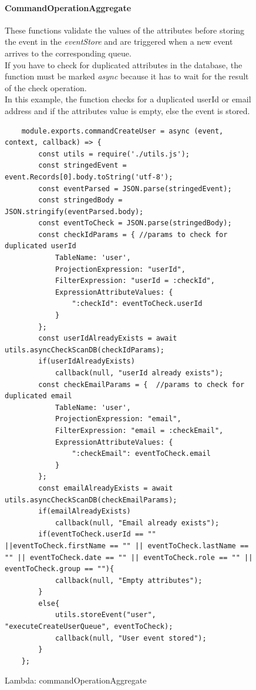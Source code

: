 \begin{figure}
\paragraph{CommandOperationAggregate} \Spazio
These functions validate the values of the attributes before storing the event in the \emph{eventStore} and are triggered when a new event arrives to the corresponding queue. \\ 
If you have to check for duplicated attributes in the database, the function must be marked \emph{async} because it has to wait for the result of the check operation.\\
In this example, the function checks for a duplicated userId or email address and if the attributes value is empty, else the event is stored.
\begin{lstlisting}
	module.exports.commandCreateUser = async (event, context, callback) => {
		const utils = require('./utils.js');
		const stringedEvent = event.Records[0].body.toString('utf-8'); 
		const eventParsed = JSON.parse(stringedEvent);
		const stringedBody = JSON.stringify(eventParsed.body);
		const eventToCheck = JSON.parse(stringedBody);
		const checkIdParams = { //params to check for duplicated userId
			TableName: 'user',
			ProjectionExpression: "userId",
			FilterExpression: "userId = :checkId",
			ExpressionAttributeValues: {
				":checkId": eventToCheck.userId
			}
		};
		const userIdAlreadyExists = await utils.asyncCheckScanDB(checkIdParams); 
		if(userIdAlreadyExists)
			callback(null, "userId already exists");
		const checkEmailParams = {  //params to check for duplicated email
			TableName: 'user',
			ProjectionExpression: "email",
			FilterExpression: "email = :checkEmail",
			ExpressionAttributeValues: {
				":checkEmail": eventToCheck.email
			}
		};
		const emailAlreadyExists = await utils.asyncCheckScanDB(checkEmailParams);
		if(emailAlreadyExists)
			callback(null, "Email already exists");
		if(eventToCheck.userId == "" ||eventToCheck.firstName == "" || eventToCheck.lastName == "" || eventToCheck.date == "" || eventToCheck.role == "" || eventToCheck.group == ""){ 
			callback(null, "Empty attributes");
		}
		else{
			utils.storeEvent("user", "executeCreateUserQueue", eventToCheck);
			callback(null, "User event stored");
		}
	};
\end{lstlisting}
	\caption{Lambda: commandOperationAggregate}
\end{figure}

